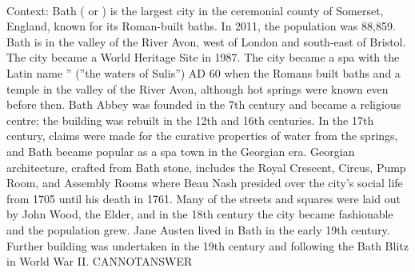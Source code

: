 \documentclass[11pt,a4paper, onecolumn]{article}
\begin{document}
\\ Context: Bath ( or ) is the largest city in the ceremonial county of Somerset, England, known for its Roman-built baths. In 2011, the population was 88,859. Bath is in the valley of the River Avon, west of London and south-east of Bristol. The city became a World Heritage Site in 1987. The city became a spa with the Latin name '' (''the waters of Sulis'') AD 60 when the Romans built baths and a temple in the valley of the River Avon, although hot springs were known even before then. Bath Abbey was founded in the 7th century and became a religious centre; the building was rebuilt in the 12th and 16th centuries. In the 17th century, claims were made for the curative properties of water from the springs, and Bath became popular as a spa town in the Georgian era. Georgian architecture, crafted from Bath stone, includes the Royal Crescent, Circus, Pump Room, and Assembly Rooms where Beau Nash presided over the city's social life from 1705 until his death in 1761. Many of the streets and squares were laid out by John Wood, the Elder, and in the 18th century the city became fashionable and the population grew. Jane Austen lived in Bath in the early 19th century. Further building was undertaken in the 19th century and following the Bath Blitz in World War II. CANNOTANSWER
\end{document}
